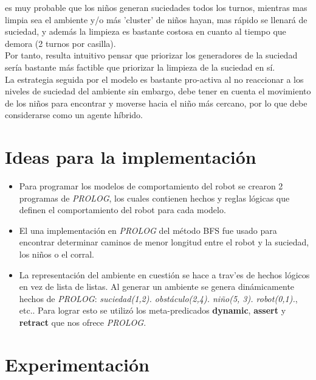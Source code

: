 \documentclass[12pt]{article}
\begin{document}
\begin{itemize}
	es muy probable que los ni\~nos generan suciedades todos los turnos, mientras mas limpia sea el ambiente y/o m\'as
	'cluster' de ni\~nos hayan, mas r\'apido se llenar\'a de suciedad, y adem\'as la limpieza es bastante costosa en 
	cuanto al tiempo que demora (2 turnos por casilla).\\
	Por tanto, resulta intuitivo pensar que priorizar los generadores de la suciedad ser\'ia bastante m\'as factible que
	priorizar la limpieza de la suciedad en s\'i.\\
	La estrategia seguida por el modelo es bastante pro-activa al no reaccionar a los niveles de suciedad del ambiente 
	sin embargo, debe tener en cuenta el movimiento de los ni\~nos para encontrar y moverse hacia el ni\~no m\'as cercano,
	por lo que debe considerarse como un agente h\'ibrido. 
\end{itemize}

\section{Ideas para la implementaci\'on}
	\begin{itemize}
		\item Para programar los modelos de comportamiento del robot se crearon
		2 programas de \textit{PROLOG}, los cuales contienen hechos y reglas l\'ogicas que
		definen el comportamiento del robot para cada modelo.
		\item El una implementaci\'on en \textit{PROLOG} del m\'etodo BFS fue usado para 
		encontrar determinar caminos de menor longitud entre el robot y la suciedad,
		los ni\~nos o el corral.
		\item La representaci\'on del ambiente en cuesti\'on se hace a trav'es de
		hechos l\'ogicos en vez de lista de listas. Al generar un ambiente se
		genera din\'amicamente hechos de \textit{PROLOG}: \textit{suciedad(1,2). 
		obst\'aculo(2,4). ni\~no(5, 3). robot(0,1).}, etc.. Para lograr esto se
		utiliz\'o los meta-predicados  \textbf{dynamic}, \textbf{assert} y \textbf{retract}
		que nos ofrece \textit{PROLOG}.
	\end{itemize}
\section{Experimentaci\'on}
\end{document}
